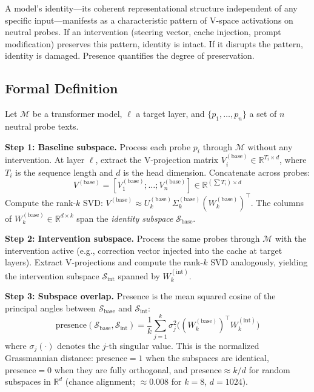 \documentclass[11pt,a4paper]{article}
\begin{document}
A model's identity---its coherent representational structure independent of
any specific input---manifests as a characteristic pattern of V-space
activations on neutral probes. If an intervention (steering vector, cache
injection, prompt modification) preserves this pattern, identity is intact.
If it disrupts the pattern, identity is damaged. Presence quantifies the
degree of preservation.

\subsection{Formal Definition}

Let $\mathcal{M}$ be a transformer model, $\ell$ a target layer, and
$\{p_1, \ldots, p_n\}$ a set of $n$ neutral probe texts.

\textbf{Step 1: Baseline subspace.} Process each probe $p_i$ through
$\mathcal{M}$ without any intervention. At layer $\ell$, extract the
V-projection matrix $V_i^{(\text{base})} \in \mathbb{R}^{T_i \times d}$,
where $T_i$ is the sequence length and $d$ is the head dimension. Concatenate
across probes:
\[
V^{(\text{base})} = [V_1^{(\text{base})}; \ldots; V_n^{(\text{base})}]
  \in \mathbb{R}^{(\sum T_i) \times d}
\]
Compute the rank-$k$ SVD: $V^{(\text{base})} \approx U_k^{(\text{base})}
\Sigma_k^{(\text{base})} (W_k^{(\text{base})})^\top$. The columns of
$W_k^{(\text{base})} \in \mathbb{R}^{d \times k}$ span the
\emph{identity subspace} $\mathcal{S}_{\text{base}}$.

\textbf{Step 2: Intervention subspace.} Process the same probes through
$\mathcal{M}$ with the intervention active (e.g., correction vector injected
into the cache at target layers). Extract V-projections and compute the
rank-$k$ SVD analogously, yielding the intervention subspace
$\mathcal{S}_{\text{int}}$ spanned by $W_k^{(\text{int})}$.

\textbf{Step 3: Subspace overlap.} Presence is the mean squared cosine of the
principal angles between $\mathcal{S}_{\text{base}}$ and
$\mathcal{S}_{\text{int}}$:
\begin{equation}
\text{presence}(\mathcal{S}_{\text{base}}, \mathcal{S}_{\text{int}})
  = \frac{1}{k} \sum_{j=1}^{k} \sigma_j^2
    \bigl( (W_k^{(\text{base})})^\top W_k^{(\text{int})} \bigr)
\label{eq:presence}
\end{equation}
where $\sigma_j(\cdot)$ denotes the $j$-th singular value. This is the
normalized Grassmannian distance: $\text{presence} = 1$ when the subspaces
are identical, $\text{presence} = 0$ when they are fully orthogonal, and
$\text{presence} \approx k/d$ for random subspaces in $\mathbb{R}^d$
(chance alignment; $\approx 0.008$ for $k{=}8$, $d{=}1024$).
\end{document}
